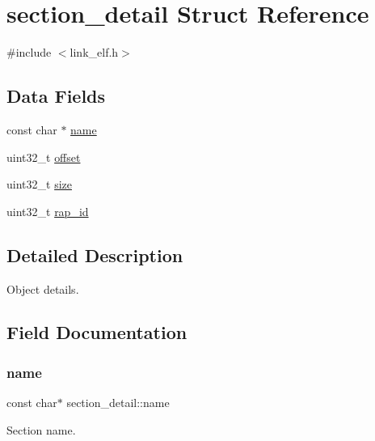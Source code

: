 \hypertarget{structsection__detail}{}\section{section\+\_\+detail Struct Reference}
\label{structsection__detail}


{\ttfamily \#include $<$link\+\_\+elf.\+h$>$}

\subsection*{Data Fields}
\begin{DoxyCompactItemize}
\item 
const char $\ast$ \mbox{\hyperlink{structsection__detail_a2d7b2b6f57d0335088af3395ef3a8942}{name}}
\item 
uint32\+\_\+t \mbox{\hyperlink{structsection__detail_a92f84f53e83744a74ac1ac1c3f44b759}{offset}}
\item 
uint32\+\_\+t \mbox{\hyperlink{structsection__detail_a4d486d3842f29a57e365f3c4d8328221}{size}}
\item 
uint32\+\_\+t \mbox{\hyperlink{structsection__detail_a5963558402c0ef2d45a41fd3d6a4d49d}{rap\+\_\+id}}
\end{DoxyCompactItemize}


\subsection{Detailed Description}
Object details. 

\subsection{Field Documentation}
\mbox{\label{structsection__detail_a2d7b2b6f57d0335088af3395ef3a8942}} 
\subsubsection{\texorpdfstring{name}{name}}
{\footnotesize\ttfamily const char$\ast$ section\+\_\+detail\+::name}

Section name. \mbox{\label{structsection__detail_a92f84f53e83744a74ac1ac1c3f44b759}} 
